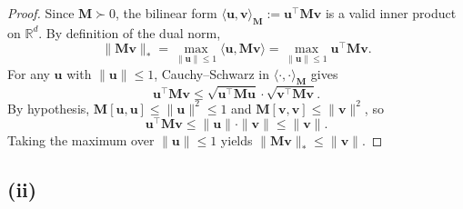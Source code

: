 \documentclass[12pt]{article}
\begin{document}
\begin{proof}
Since $\mathbf{M} \succ 0$, the bilinear form $\langle \mathbf{u}, \mathbf{v} \rangle_{\mathbf{M}} := \mathbf{u}^\top \mathbf{M} \mathbf{v}$ is a valid inner product on $\mathbb{R}^d$. By definition of the dual norm,
\[
\|\mathbf{M}\mathbf{v}\|_* = \max_{\|\mathbf{u}\| \leq 1} \langle \mathbf{u}, \mathbf{M}\mathbf{v} \rangle = \max_{\|\mathbf{u}\| \leq 1} \mathbf{u}^\top \mathbf{M} \mathbf{v}.
\]
For any $\mathbf{u}$ with $\|\mathbf{u}\| \leq 1$, Cauchy--Schwarz in $\langle \cdot, \cdot \rangle_{\mathbf{M}}$ gives
\[
\mathbf{u}^\top \mathbf{M} \mathbf{v} \leq \sqrt{\mathbf{u}^\top \mathbf{M} \mathbf{u}} \cdot \sqrt{\mathbf{v}^\top \mathbf{M} \mathbf{v}}.
\]
By hypothesis, $\mathbf{M}[\mathbf{u}, \mathbf{u}] \leq \|\mathbf{u}\|^2 \leq 1$ and $\mathbf{M}[\mathbf{v}, \mathbf{v}] \leq \|\mathbf{v}\|^2$, so
\[
\mathbf{u}^\top \mathbf{M} \mathbf{v} \leq \|\mathbf{u}\| \cdot \|\mathbf{v}\| \leq \|\mathbf{v}\|.
\]
Taking the maximum over $\|\mathbf{u}\| \leq 1$ yields $\|\mathbf{M}\mathbf{v}\|_* \leq \|\mathbf{v}\|$.
\end{proof}

\subsection*{(ii)}
\end{document}
